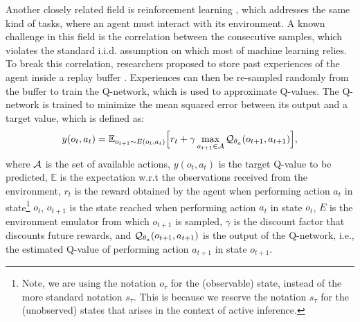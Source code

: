 \documentclass[twoside,11pt]{article}
\let\oldmathcal\mathcal
\renewcommand{\mathcal}[1]{%
  \IfSubStr{ABCDEFGHIJKLMNOPQRSTUVWXYZ}{#1}{\oldmathcal{#1}}{\mathdutchcal{#1}}
}
\begin{document}
Another closely related field is reinforcement learning \citep{DeepRL,DDQN,lample2016playing}, which addresses the same kind of tasks, where an agent must interact with its environment. A known challenge in this field is the correlation between the consecutive samples, which violates the standard i.i.d. assumption on which most of machine learning relies. To break this correlation, researchers proposed to store past experiences of the agent inside a replay buffer \citep{DeepRL}. Experiences can then be re-sampled randomly from the buffer to train the Q-network, which is used to approximate Q-values. The Q-network is trained to minimize the mean squared error between its output and a target value, which is defined as:
$$y(o_t,a_t) = \mathbb{E}_{o_{t+1} \sim E(o_t,a_t)}\Big[ r_t + \gamma \max_{a_{t+1} \in \mathcal{A}} \mathcal{Q}_{\theta_a}(o_{t+1}, a_{t+1})\Big],$$
where $\mathcal{A}$ is the set of available actions, $y(o_t,a_t)$ is the target Q-value to be predicted, $\mathbb{E}$ is the expectation w.r.t the observations received from the environment, $r_t$ is the reward obtained by the agent when performing action $a_t$ in state\footnote{Note, we are using the notation $o_\tau$ for the (observable) state, instead of the more standard notation $s_\tau$. This is because we reserve the notation $s_\tau$ for the (unobserved) states that arises in the context of active inference.} $o_t$, $o_{t+1}$ is the state reached when performing action $a_t$ in state $o_t$, $E$ is the environment emulator from which $o_{t+1}$ is sampled, $\gamma$ is the discount factor that discounts future rewards, and $\mathcal{Q}_{\theta_a}(o_{t+1}, a_{t+1})$ is the output of the Q-network, i.e., the estimated Q-value of performing action $a_{t+1}$ in state $o_{t+1}$.
\end{document}
